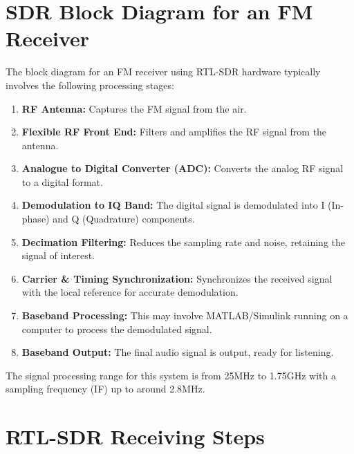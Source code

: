 \section*{SDR Block Diagram for an FM Receiver}

The block diagram for an FM receiver using RTL-SDR hardware typically involves the following processing stages:
\begin{enumerate}
    \item \textbf{RF Antenna:} Captures the FM signal from the air.
    \item \textbf{Flexible RF Front End:} Filters and amplifies the RF signal from the antenna.
    \item \textbf{Analogue to Digital Converter (ADC):} Converts the analog RF signal to a digital format.
    \item \textbf{Demodulation to IQ Band:} The digital signal is demodulated into I (In-phase) and Q (Quadrature) components.
    \item \textbf{Decimation Filtering:} Reduces the sampling rate and noise, retaining the signal of interest.
    \item \textbf{Carrier \& Timing Synchronization:} Synchronizes the received signal with the local reference for accurate demodulation.
    \item \textbf{Baseband Processing:} This may involve MATLAB/Simulink running on a computer to process the demodulated signal.
    \item \textbf{Baseband Output:} The final audio signal is output, ready for listening.
\end{enumerate}
The signal processing range for this system is from 25MHz to 1.75GHz with a sampling frequency (IF) up to around 2.8MHz.


\section*{RTL-SDR Receiving Steps}

